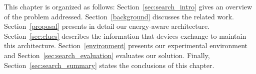 This chapter is organized as follows:
Section~\ref{sec:search_intro} gives an overview of the problem addressed.
Section~\ref{background} discusses the related work.
Section~\ref{proposal} presents in detail our energy-aware architecture.
Section~\ref{sec:clues} describes the information that devices exchange to maintain this architecture.
Section~\ref{environment} presents our experimental environment and Section~\ref{sec:search_evaluation} evaluates our solution.
Finally, Section~\ref{sec:search_summary} states the conclusions of this chapter.












